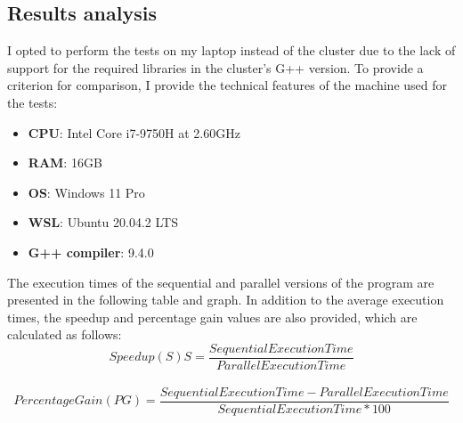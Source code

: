 \documentclass{article}
\begin{document}
\subsection*{Results analysis}
I opted to perform the tests on my laptop instead of the cluster due to the lack of support for the required libraries in the cluster's G++ version.
To provide a criterion for comparison, I provide the technical features of the machine used for the tests:
\begin{itemize}
    \item \textbf{CPU}: Intel\textsuperscript{\textregistered} Core\textsuperscript{\texttrademark} i7-9750H at 2.60GHz
    \item \textbf{RAM}: 16GB
    \item \textbf{OS}: Windows 11 Pro
    \item \textbf{WSL}: Ubuntu 20.04.2 LTS
    \item \textbf{G++ compiler}: 9.4.0
\end{itemize}



The execution times of the sequential and parallel versions of the program are presented in the following table and graph.
In addition to the average execution times, the speedup and percentage gain values are also provided, which are calculated as follows:
\begin{equation}
    Speedup(S) S = \frac{Sequential Execution Time}{Parallel Execution Time}
\end{equation} \\
\begin{equation}
    Percentage Gain(PG) = \frac{Sequential Execution Time - Parallel Execution Time}{Sequential Execution Time * 100}
\end{equation}
\end{document}
